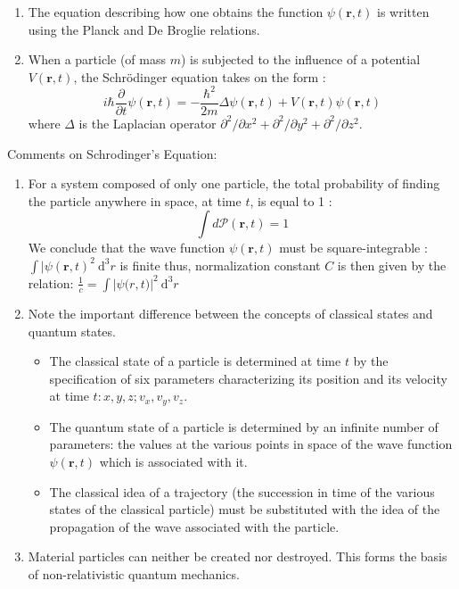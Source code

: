 \documentclass[%
 reprint,
 amsmath,amssymb,
 aps,
]{revtex4-2}
\begin{document}
\begin{enumerate}
\begin{itemize}
$$$$
The presence of the denominator ensures that the total probability is equal to 1 :
$$
\left.\sum_i \mathscr{P}_{a_{i}}=1\right.
$$
 \item If the measurement indeed yields $a_i$, the wave function of the particle immediately after the measurement is :
$$
\psi^{\prime}\left(\mathbf{r}, t_0\right)=\psi_{a_{i}}(\mathbf{r})
$$
 \end{itemize}
\item The equation describing how one obtains  the function $\psi(\mathbf{r}, t)$ is written using the Planck and De Broglie relations.
\item When a particle (of mass $m$) is subjected to the influence of a potential  $V(\mathbf{r}, t)$, the Schrödinger equation takes on the form :
$$
i \hbar \frac{\partial}{\partial t} \psi(\mathbf{r}, t)=-\frac{\hbar^2}{2 m} \Delta \psi(\mathbf{r}, t)+V(\mathbf{r}, t) \psi(\mathbf{r}, t)
$$
where $\Delta$ is the Laplacian operator $\partial^2 / \partial x^2+\partial^2 / \partial y^2+\partial^2 / \partial z^2$.
\end{enumerate}
Comments on Schrodinger's Equation:
\begin{enumerate}
\item For a system composed of only one particle, the total probability of finding the particle anywhere in space, at time $t$, is equal to 1 :
$$
\int d \mathscr{P}(\mathbf{r}, t)=1
$$
We conclude that the wave function $\psi(\mathbf{r}, t)$ must be square-integrable :
$\int \mid \psi(\mathbf{r}, t)^2 \mathrm{~d}^3 r$ is finite thus, normalization constant $C$ is then given by the relation:
$\frac{1}{c}=\int \mid \psi(\left.r,\left.t)\right|^2 \mathrm{~d}^3 r\right.$
\item  Note the important difference between the concepts of classical states and quantum states. 
 \begin{itemize}
\item The classical state of a particle is determined at time $t$ by the specification of six parameters characterizing its position and its velocity at time $t: x, y, z ; v_x, v_y, v_z$. 
\item The quantum state of a particle is determined by an infinite number of parameters: the values at the various points in space of the wave function $\psi(\mathbf{r}, t)$ which is associated with it. 
\item The classical idea of a trajectory (the succession in time of the various states of the classical particle) must be substituted with the idea of the propagation of the wave associated with the particle. 
\end{itemize}
\item Material particles can neither be created nor destroyed. This forms the basis of non-relativistic quantum mechanics.
\end{enumerate}
\end{document}
